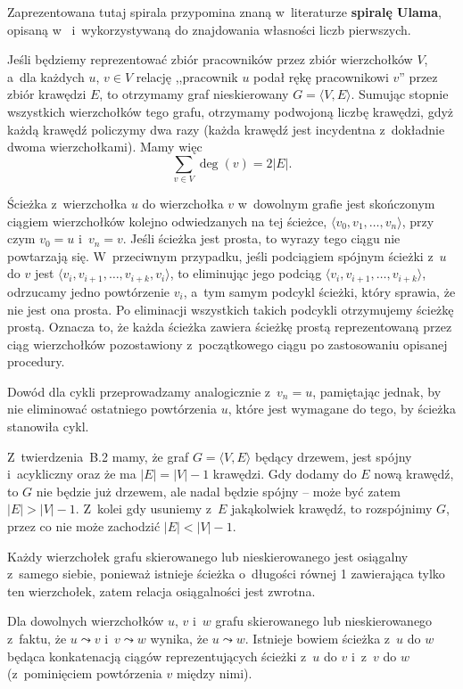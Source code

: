 Zaprezentowana tutaj spirala przypomina znaną w~literaturze \textbf{spiralę Ulama}, opisaną w~\cite{ulamspiral} i~wykorzystywaną do znajdowania własności liczb pierwszych.


\exercise %
Jeśli będziemy reprezentować zbiór pracowników przez zbiór wierzchołków $V$, a~dla każdych $u$, $v\in V$ relację ,,pracownik $u$ podał rękę pracownikowi $v$'' przez zbiór krawędzi $E$, to otrzymamy graf nieskierowany $G=\langle V,E\rangle$.
Sumując stopnie wszystkich wierzchołków tego grafu, otrzymamy podwojoną liczbę krawędzi, gdyż każdą krawędź policzymy dwa razy (każda krawędź jest incydentna z~dokładnie dwoma wierzchołkami).
Mamy więc
\[
	\sum_{v\in V}\deg(v) = 2|E|.
\]

\exercise %
Ścieżka z~wierzchołka $u$ do wierzchołka $v$ w~dowolnym grafie jest skończonym ciągiem wierzchołków kolejno odwiedzanych na tej ścieżce, $\langle v_0,v_1,\dots,v_n\rangle$, przy czym $v_0=u$ i~$v_n=v$.
Jeśli ścieżka jest prosta, to wyrazy tego ciągu nie powtarzają się.
W~przeciwnym przypadku, jeśli podciągiem spójnym ścieżki z~$u$ do $v$ jest $\langle v_i,v_{i+1},\dots,v_{i+k},v_i\rangle$, to eliminując jego podciąg $\langle v_i,v_{i+1},\dots,v_{i+k}\rangle$, odrzucamy jedno powtórzenie $v_i$, a~tym samym podcykl ścieżki, który sprawia, że nie jest ona prosta.
Po eliminacji wszystkich takich podcykli otrzymujemy ścieżkę prostą.
Oznacza to, że każda ścieżka zawiera ścieżkę prostą reprezentowaną przez ciąg wierzchołków pozostawiony z~początkowego ciągu po zastosowaniu opisanej procedury.

Dowód dla cykli przeprowadzamy analogicznie z~$v_n=u$, pamiętając jednak, by nie eliminować ostatniego powtórzenia $u$, które jest wymagane do tego, by ścieżka stanowiła cykl.

\exercise %
Z~twierdzenia~B.2 mamy, że graf $G=\langle V,E\rangle$ będący drzewem, jest spójny i~acykliczny oraz że ma $|E|=|V|-1$ krawędzi.
Gdy dodamy do $E$ nową krawędź, to $G$ nie będzie już drzewem, ale nadal będzie spójny -- może być zatem $|E|>|V|-1$.
Z~kolei gdy usuniemy z~$E$ jakąkolwiek krawędź, to rozspójnimy $G$, przez co nie może zachodzić $|E|<|V|-1$.

\exercise %
Każdy wierzchołek grafu skierowanego lub nieskierowanego jest osiągalny z~samego siebie, ponieważ istnieje ścieżka o~długości równej 1 zawierająca tylko ten wierzchołek, zatem relacja osiągalności jest zwrotna.

Dla dowolnych wierzchołków $u$, $v$ i~$w$ grafu skierowanego lub nieskierowanego z~faktu, że $u\leadsto v$ i~$v\leadsto w$ wynika, że $u\leadsto w$.
Istnieje bowiem ścieżka z~$u$ do $w$ będąca konkatenacją ciągów reprezentujących ścieżki z~$u$ do $v$ i~z~$v$ do $w$ (z~pominięciem powtórzenia $v$ między nimi).

